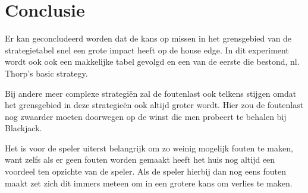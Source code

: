 \documentclass[conference]{IEEEtran}
\begin{document}
\section{Conclusie}
Er kan geconcludeerd worden dat de kans op missen in het grensgebied van de strategietabel snel een grote impact heeft op de house edge.
In dit experiment wordt ook ook een makkelijke tabel gevolgd en een van de eerste die bestond, nl. Thorp's basic strategy.

Bij andere meer complexe strategiën zal de foutenlast ook telkens stijgen omdat het grensgebied in deze strategieën ook altijd groter wordt.
Hier zou de foutenlast nog zwaarder moeten doorwegen op de winst die men probeert te behalen bij Blackjack.

Het is voor de speler uiterst belangrijk om zo weinig mogelijk fouten te maken, want zelfs als er geen fouten worden gemaakt heeft het huis nog altijd een voordeel ten opzichte van de speler.
Als de speler hierbij dan nog eens fouten maakt zet zich dit immers meteen om in een grotere kans om verlies te maken.





%







%
%
%
\nocite{baldwin1956optimum,bain1992introduction,kendall2003evolution}



%
%



\end{document}
